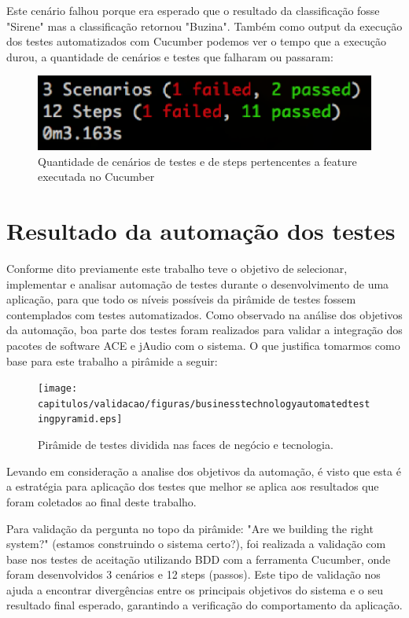 Este cenário falhou porque era esperado que o resultado da classificação fosse "Sirene" mas a classificação retornou "Buzina". Também como output da execução dos testes automatizados com Cucumber podemos ver o tempo que a execução durou, a quantidade de cenários e testes que falharam ou passaram:

\begin{figure}[H]
	\centering
	\captionsetup{justification=centering,margin=2cm}
	\includegraphics[scale=0.65]{capitulos/validacao/figuras/quantidadeDeErrosQpassaramOUn.eps}
	\caption{Quantidade de cenários de testes e de steps pertencentes a feature executada no Cucumber}
	\label{fig:result-engajamento}
\end{figure}

\section{Resultado da automação dos testes}
Conforme dito previamente este trabalho teve o objetivo de selecionar, implementar e analisar automação de testes durante o desenvolvimento de uma aplicação, para que todo os níveis possíveis da pirâmide de testes \cite{James2011} fossem contemplados com testes automatizados. Como observado na análise dos objetivos da automação, boa parte dos testes foram realizados para validar a integração dos pacotes de software ACE e jAudio com o sistema. O que justifica tomarmos como base para este trabalho a pirâmide a seguir: 

\begin{figure}[H]
	\centering
	\captionsetup{justification=centering,margin=2cm}
	\texttt{[image: capitulos/validacao/figuras/businesstechnologyautomatedtestingpyramid.eps]}
	\caption{Pirâmide de testes dividida nas faces de negócio e tecnologia.}
	\label{fig:result-engajamento}
\end{figure}

Levando em consideração a analise dos objetivos da automação, é visto que esta é a estratégia para aplicação dos testes que melhor se aplica aos resultados que foram coletados ao final deste trabalho.

Para validação da pergunta no topo da pirâmide: "Are we building the right system?" (estamos construindo o sistema certo?), foi realizada a validação com base nos testes de aceitação utilizando BDD com a ferramenta Cucumber,  onde foram desenvolvidos 3 cenários e 12 steps (passos). Este tipo de validação nos ajuda a encontrar divergências entre os principais objetivos do sistema e o seu resultado final esperado, garantindo a verificação do comportamento da aplicação. 


